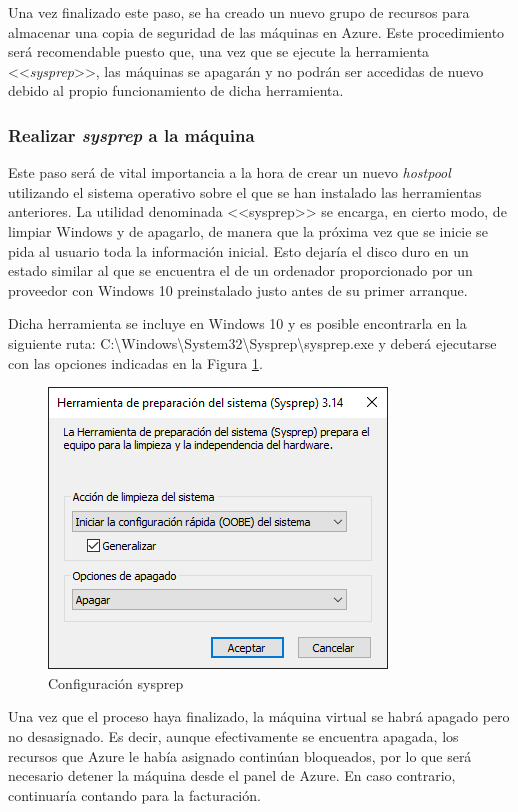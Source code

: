 Una vez finalizado este paso, se ha creado un nuevo grupo de recursos para almacenar una copia de seguridad de las máquinas en Azure. Este procedimiento será recomendable puesto que, una vez que se ejecute la herramienta <<\textit{sysprep}>>, las máquinas se apagarán y no podrán ser accedidas de nuevo debido al propio funcionamiento de dicha herramienta.

\clearpage

\subsubsection{Realizar \textit{sysprep} a la máquina}
Este paso será de vital importancia a la hora de crear un nuevo \textit{hostpool} utilizando el sistema operativo sobre el que se han instalado las herramientas anteriores. La utilidad denominada <<sysprep>> se encarga, en cierto modo, de limpiar Windows y de apagarlo, de manera que la próxima vez que se inicie se pida al usuario toda la información inicial. Esto dejaría el disco duro en un estado similar al que se encuentra el de un ordenador proporcionado por un proveedor con Windows 10 preinstalado justo antes de su primer arranque.

Dicha herramienta se incluye en Windows 10 y es posible encontrarla en la siguiente ruta: C:\textbackslash Windows\textbackslash System32\textbackslash Sysprep\textbackslash sysprep.exe y deberá ejecutarse con las opciones indicadas en la Figura \ref{fig:conf_sysprep}.

\begin{figure}[h]
  \centering
  \includegraphics[width=0.5\linewidth]{figures/images/casos_uso/sysprep.PNG}
  \caption{Configuración sysprep}
  \label{fig:conf_sysprep}
\end{figure}

Una vez que el proceso haya finalizado, la máquina virtual se habrá apagado pero no desasignado. Es decir, aunque efectivamente se encuentra apagada, los recursos que Azure le había asignado continúan bloqueados, por lo que será necesario detener la máquina desde el panel de Azure. En caso contrario, continuaría contando para la facturación.

